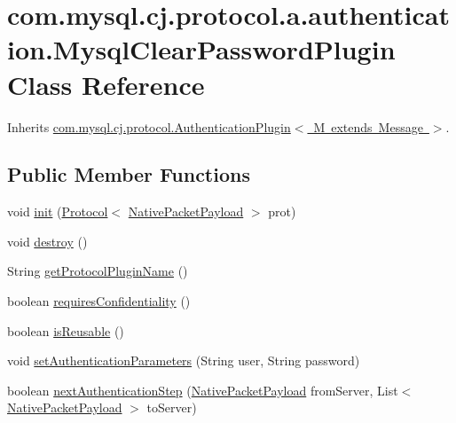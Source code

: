 \hypertarget{classcom_1_1mysql_1_1cj_1_1protocol_1_1a_1_1authentication_1_1_mysql_clear_password_plugin}{}\section{com.\+mysql.\+cj.\+protocol.\+a.\+authentication.\+Mysql\+Clear\+Password\+Plugin Class Reference}
\label{classcom_1_1mysql_1_1cj_1_1protocol_1_1a_1_1authentication_1_1_mysql_clear_password_plugin}


Inherits \mbox{\hyperlink{interfacecom_1_1mysql_1_1cj_1_1protocol_1_1_authentication_plugin}{com.\+mysql.\+cj.\+protocol.\+Authentication\+Plugin$<$ M extends Message $>$}}.

\subsection*{Public Member Functions}
\begin{DoxyCompactItemize}
\item 
void \mbox{\hyperlink{classcom_1_1mysql_1_1cj_1_1protocol_1_1a_1_1authentication_1_1_mysql_clear_password_plugin_a09238a43ce5f377824c6300dbcbb75b0}{init}} (\mbox{\hyperlink{interfacecom_1_1mysql_1_1cj_1_1protocol_1_1_protocol}{Protocol}}$<$ \mbox{\hyperlink{classcom_1_1mysql_1_1cj_1_1protocol_1_1a_1_1_native_packet_payload}{Native\+Packet\+Payload}} $>$ prot)
\item 
void \mbox{\hyperlink{classcom_1_1mysql_1_1cj_1_1protocol_1_1a_1_1authentication_1_1_mysql_clear_password_plugin_aba0d857281cb3a18fe00d3e3d8b63016}{destroy}} ()
\item 
String \mbox{\hyperlink{classcom_1_1mysql_1_1cj_1_1protocol_1_1a_1_1authentication_1_1_mysql_clear_password_plugin_aa462c22d7def92918450800cdeb62893}{get\+Protocol\+Plugin\+Name}} ()
\item 
boolean \mbox{\hyperlink{classcom_1_1mysql_1_1cj_1_1protocol_1_1a_1_1authentication_1_1_mysql_clear_password_plugin_a3e8370e46183b941e2fc6d72f06a37a1}{requires\+Confidentiality}} ()
\item 
boolean \mbox{\hyperlink{classcom_1_1mysql_1_1cj_1_1protocol_1_1a_1_1authentication_1_1_mysql_clear_password_plugin_a8ffe3c702b20c1efd428dfef9ba58228}{is\+Reusable}} ()
\item 
void \mbox{\hyperlink{classcom_1_1mysql_1_1cj_1_1protocol_1_1a_1_1authentication_1_1_mysql_clear_password_plugin_aac79ca0c6d0e4fd7207f2de8e6f1e6a8}{set\+Authentication\+Parameters}} (String user, String password)
\item 
boolean \mbox{\hyperlink{classcom_1_1mysql_1_1cj_1_1protocol_1_1a_1_1authentication_1_1_mysql_clear_password_plugin_a960f58e4a3c7032cb49ff3c30cf069f8}{next\+Authentication\+Step}} (\mbox{\hyperlink{classcom_1_1mysql_1_1cj_1_1protocol_1_1a_1_1_native_packet_payload}{Native\+Packet\+Payload}} from\+Server, List$<$ \mbox{\hyperlink{classcom_1_1mysql_1_1cj_1_1protocol_1_1a_1_1_native_packet_payload}{Native\+Packet\+Payload}} $>$ to\+Server)
\end{DoxyCompactItemize}


